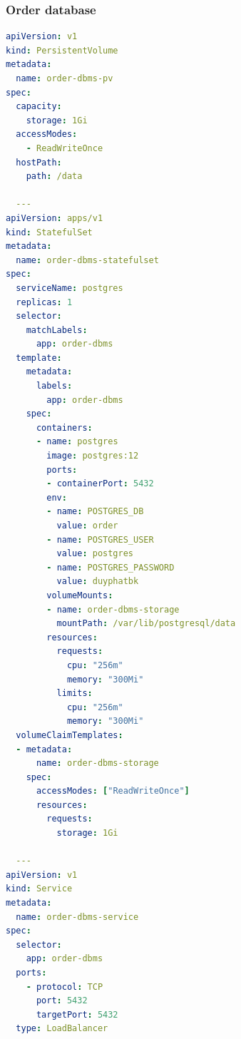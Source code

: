 \subsubsection*{Order database}
\begin{lstlisting}[language=yaml]
apiVersion: v1
kind: PersistentVolume
metadata:
  name: order-dbms-pv
spec:
  capacity:
    storage: 1Gi
  accessModes:
    - ReadWriteOnce
  hostPath:
    path: /data

  ---
apiVersion: apps/v1
kind: StatefulSet
metadata:
  name: order-dbms-statefulset
spec:
  serviceName: postgres
  replicas: 1
  selector:
    matchLabels:
      app: order-dbms
  template:
    metadata:
      labels:
        app: order-dbms
    spec:
      containers:
      - name: postgres
        image: postgres:12
        ports:
        - containerPort: 5432
        env:
        - name: POSTGRES_DB
          value: order
        - name: POSTGRES_USER
          value: postgres
        - name: POSTGRES_PASSWORD
          value: duyphatbk
        volumeMounts:
        - name: order-dbms-storage
          mountPath: /var/lib/postgresql/data
        resources:
          requests:
            cpu: "256m"
            memory: "300Mi"
          limits:
            cpu: "256m"
            memory: "300Mi"  
  volumeClaimTemplates:
  - metadata:
      name: order-dbms-storage
    spec:
      accessModes: ["ReadWriteOnce"]
      resources:
        requests:
          storage: 1Gi

  ---
apiVersion: v1
kind: Service
metadata:
  name: order-dbms-service
spec:
  selector:
    app: order-dbms
  ports:
    - protocol: TCP
      port: 5432
      targetPort: 5432
  type: LoadBalancer
\end{lstlisting}

